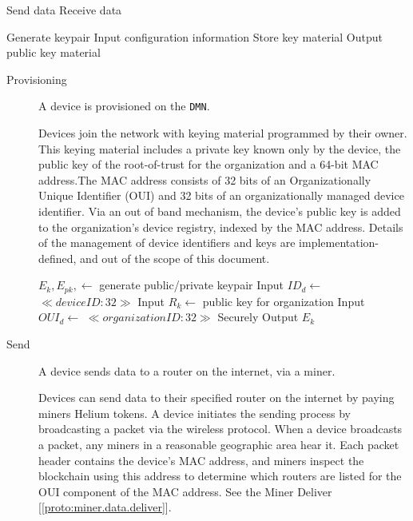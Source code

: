 \documentclass[10pt, nonatbib, nocopyrightspace, reprint]{sigplanconf}
\newenvironment{protocol}[2]{
  \begin{algorithm}[!htb]
    \DontPrintSemicolon
    \caption{#1}\label{#2}
}{
  \end{algorithm}
  \FloatBarrier
}
\newcommand{\protoref}[1]{[\autoref{#1}]}
\begin{document}
\begin{protocol}{Device Protocol Overview}{proto:device}

   {
    Send data \;
    Receive data \;
  }

   {
    Generate keypair \;
    Input configuration information \;
    Store key material \;
    Output public key material \;
  }
\end{protocol}


\begin{description}
  \item [Provisioning] A device is provisioned on the \verb|DMN|.

    Devices join the network with keying material programmed by their owner. This keying material includes a private key known only by the device, the public key of the root-of-trust for the organization and a 64-bit MAC address.The MAC address consists of 32 bits of an Organizationally Unique Identifier (OUI) and 32 bits of an organizationally managed device identifier. Via an out of band mechanism, the device's public key is added to the organization's device registry, indexed by the MAC address. Details of the management of device identifiers and keys are implementation-defined, and out of the scope of this document.

    \begin{protocol}{Device Provisioning}{proto:device.provision}

       {
        $E_k, E_{pk}, \leftarrow $ generate public/private keypair \;
        Input ${ID}_d \leftarrow $ $ \ll device ID:32 \gg $ \;
        Input $R_k \leftarrow $ public key for organization \;
        Input ${OUI}_d \leftarrow $ $ \ll organization ID:32 \gg $ \;
        \BlankLine
        Securely  \;
        \BlankLine
        Output $E_k$ \;
      }
    \end{protocol}


  \item [Send] A device sends data to a router on the internet, via a miner.

    Devices can send data to their specified router on the internet by paying miners Helium tokens.
    A device initiates the sending process by broadcasting a packet via the wireless protocol. When a device broadcasts a packet, any miners in a reasonable geographic area hear it. Each packet header contains the device's MAC address, and miners inspect the blockchain using this address to determine which routers are listed for the OUI component of the MAC address. See the Miner Deliver \protoref{proto:miner.data.deliver}.


\end{description}
\end{document}

